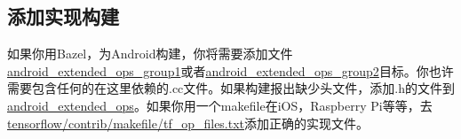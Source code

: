 \subsection{添加实现构建}
如果你用Bazel，为Android构建，你将需要添加文件\href{https://www.github.com/tensorflow/tensorflow/blob/r1.4/tensorflow/core/kernels/BUILD#L3565}{android\_extended\_ops\_group1}或者\href{https://www.github.com/tensorflow/tensorflow/blob/r1.4/tensorflow/core/kernels/BUILD#L3632}{android\_extended\_ops\_group2}目标。你也许需要包含任何的在这里依赖的.cc文件。如果构建报出缺少头文件，添加.h的文件到\href{https://www.github.com/tensorflow/tensorflow/blob/r1.4/tensorflow/core/kernels/BUILD#L3525}{android\_extended\_ops}。如果你用一个makefile在iOS，Raspberry Pi等等，去\href{https://www.github.com/tensorflow/tensorflow/blob/r1.4/tensorflow/contrib/makefile/tf_op_files.txt}{tensorflow/contrib/makefile/tf\_op\_files.txt}添加正确的实现文件。






































